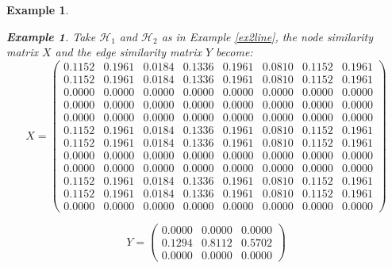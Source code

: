 \documentclass[a4paper,11pt]{report}
\newtheorem{example}[theorem]{Example}
\newcommand{\hgrafeen}{\mathcal{H}}
\begin{document}
\begin{example}
\begin{example}
  Take $\hgrafeen_1$ and $\hgrafeen_2$ as in Example \ref{ex2line}, the node 
  similarity matrix $X$ and the edge similarity matrix $Y$ become:
  $$X=\begin{pmatrix}
    0.1152&0.1961&0.0184&0.1336&0.1961&0.0810&0.1152&0.1961\\
0.1152&0.1961&0.0184&0.1336&0.1961&0.0810&0.1152&0.1961\\
0.0000&0.0000&0.0000&0.0000&0.0000&0.0000&0.0000&0.0000\\
0.0000&0.0000&0.0000&0.0000&0.0000&0.0000&0.0000&0.0000\\
0.0000&0.0000&0.0000&0.0000&0.0000&0.0000&0.0000&0.0000\\
0.1152&0.1961&0.0184&0.1336&0.1961&0.0810&0.1152&0.1961\\
0.1152&0.1961&0.0184&0.1336&0.1961&0.0810&0.1152&0.1961\\
0.0000&0.0000&0.0000&0.0000&0.0000&0.0000&0.0000&0.0000\\
0.0000&0.0000&0.0000&0.0000&0.0000&0.0000&0.0000&0.0000\\
0.1152&0.1961&0.0184&0.1336&0.1961&0.0810&0.1152&0.1961\\
0.1152&0.1961&0.0184&0.1336&0.1961&0.0810&0.1152&0.1961\\
0.0000&0.0000&0.0000&0.0000&0.0000&0.0000&0.0000&0.0000
  \end{pmatrix}$$
  
    $$Y=\begin{pmatrix}
    0.0000&0.0000&0.0000\\
0.1294&0.8112&0.5702\\
0.0000&0.0000&0.0000
  \end{pmatrix}$$
  

\end{example}


\end{example}
\end{document}
